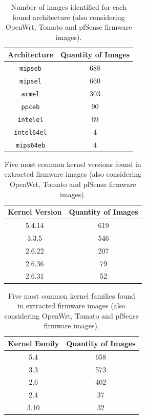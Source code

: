 \begin{table}[H]
\centering
\caption{Number of images identified for each found architecture (also considering OpenWrt, Tomato and pfSense firmware images).}
\begin{tabular}{|c|c|}
\hline
\textbf{Architecture}       & \textbf{Quantity of Images} \\ \hline
{\tt mipseb}                & 688                         \\
{\tt mipsel}                & 660                         \\
{\tt armel}                 & 303                         \\
{\tt ppceb}                 & 90                          \\
{\tt intelel}               & 69                          \\
{\tt intel64el}             & 4                           \\
{\tt mips64eb}              & 4                           \\ \hline
\end{tabular}
\label{tab:arch-stats-openwrt}
\end{table}

\begin{table}[H]
\centering
\caption{Five most common kernel versions found in extracted firmware images (also considering OpenWrt, Tomato and pfSense firmware images).}
\begin{tabular}{|c|c|}
\hline
\textbf{Kernel Version} & \textbf{Quantity of Images} \\ \hline
5.4.14                  & 619                \\
3.3.5                   & 546                \\
2.6.22                  & 207                \\
2.6.36                  & 79                 \\
2.6.31                  & 52                 \\ \hline
\end{tabular}
\label{tab:kernel-stats-openwrt}
\end{table}

\begin{table}[H]
\centering
\caption{Five most common kernel families found in extracted firmware images (also considering OpenWrt, Tomato and pfSense firmware images).}
\begin{tabular}{|c|c|}
\hline
\textbf{Kernel Family} & \textbf{Quantity of Images} \\ \hline
5.4                    & 658                \\ 
3.3                    & 573                \\ 
2.6                    & 402                \\ 
2.4                    & 37                 \\ 
3.10                   & 32                 \\ \hline
\end{tabular}
\label{tab:kernel-family-stats-openwrt}
\end{table}

